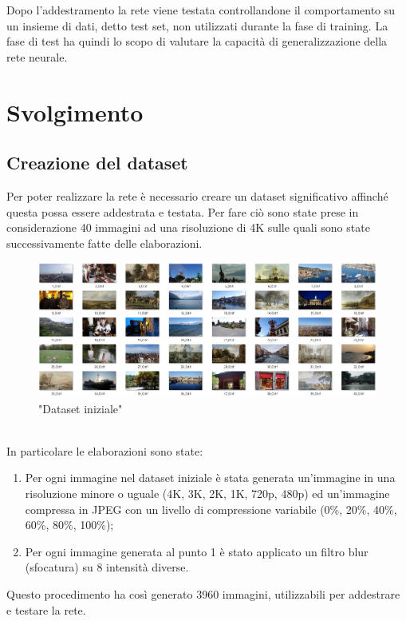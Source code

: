 \documentclass[a4paper,11pt]{article}
\begin{document}
    Dopo l’addestramento la rete viene testata controllandone il comportamento su un insieme di dati, detto test set, non utilizzati durante la fase di training. La fase di test ha quindi lo scopo 
    di valutare la capacità di generalizzazione della rete neurale.

  
    \newpage

    \section{Svolgimento}

    \subsection{Creazione del dataset}
    Per poter realizzare la rete è necessario creare un dataset significativo affinché questa possa essere addestrata e testata. 
    Per fare ciò sono state prese in considerazione 40 immagini ad una risoluzione di 4K sulle quali sono state successivamente fatte delle elaborazioni.
    \begin{figure}[h]
        \centering
        \includegraphics[scale=0.365]{dataset}
        \caption{"Dataset iniziale"}
    \end{figure}
    \\In particolare le elaborazioni sono state:
    \begin{enumerate}
        \item Per ogni immagine nel dataset iniziale è stata generata un'immagine in una risoluzione minore o uguale (4K, 3K, 2K, 1K, 720p, 480p) ed un'immagine compressa in JPEG con un livello di compressione variabile (0\%, 20\%, 40\%, 60\%, 80\%, 100\%);
        \item Per ogni immagine generata al punto 1 è stato applicato un filtro blur (sfocatura) su 8 intensità diverse.
    \end{enumerate}
    Questo procedimento ha così generato 3960 immagini, utilizzabili per addestrare e testare la rete.
    
\end{document}
